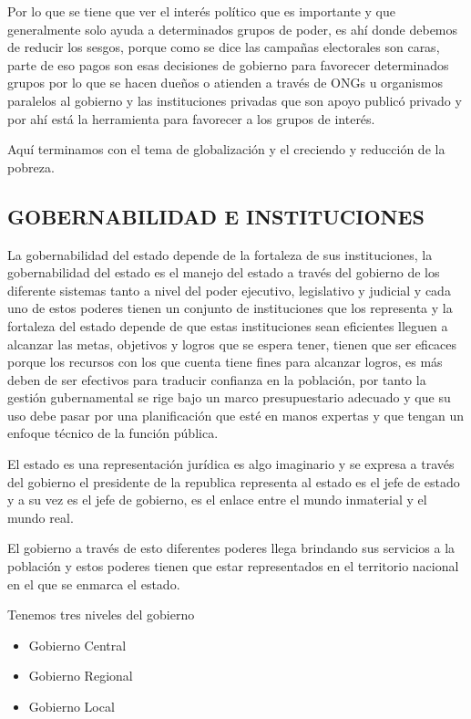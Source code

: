 \documentclass[
  a4paper,
]{article}
\providecommand{\tightlist}{%
  \setlength{\itemsep}{0pt}\setlength{\parskip}{0pt}}\usepackage{longtable,booktabs,array}
\begin{document}
Por lo que se tiene que ver el interés político que es importante y que
generalmente solo ayuda a determinados grupos de poder, es ahí donde
debemos de reducir los sesgos, porque como se dice las campañas
electorales son caras, parte de eso pagos son esas decisiones de
gobierno para favorecer determinados grupos por lo que se hacen dueños o
atienden a través de ONGs u organismos paralelos al gobierno y las
instituciones privadas que son apoyo publicó privado y por ahí está la
herramienta para favorecer a los grupos de interés.

Aquí terminamos con el tema de globalización y el creciendo y reducción
de la pobreza.

\hypertarget{gobernabilidad-e-instituciones}{%
\subsection{GOBERNABILIDAD E
INSTITUCIONES}\label{gobernabilidad-e-instituciones}}

La gobernabilidad del estado depende de la fortaleza de sus
instituciones, la gobernabilidad del estado es el manejo del estado a
través del gobierno de los diferente sistemas tanto a nivel del poder
ejecutivo, legislativo y judicial y cada uno de estos poderes tienen un
conjunto de instituciones que los representa y la fortaleza del estado
depende de que estas instituciones sean eficientes lleguen a alcanzar
las metas, objetivos y logros que se espera tener, tienen que ser
eficaces porque los recursos con los que cuenta tiene fines para
alcanzar logros, es más deben de ser efectivos para traducir confianza
en la población, por tanto la gestión gubernamental se rige bajo un
marco presupuestario adecuado y que su uso debe pasar por una
planificación que esté en manos expertas y que tengan un enfoque técnico
de la función pública.

El estado es una representación jurídica es algo imaginario y se expresa
a través del gobierno el presidente de la republica representa al estado
es el jefe de estado y a su vez es el jefe de gobierno, es el enlace
entre el mundo inmaterial y el mundo real.

El gobierno a través de esto diferentes poderes llega brindando sus
servicios a la población y estos poderes tienen que estar representados
en el territorio nacional en el que se enmarca el estado.

Tenemos tres niveles del gobierno

\begin{itemize}
\tightlist
\item
  Gobierno Central
\item
  Gobierno Regional
\item
  Gobierno Local
\end{itemize}
\end{document}
